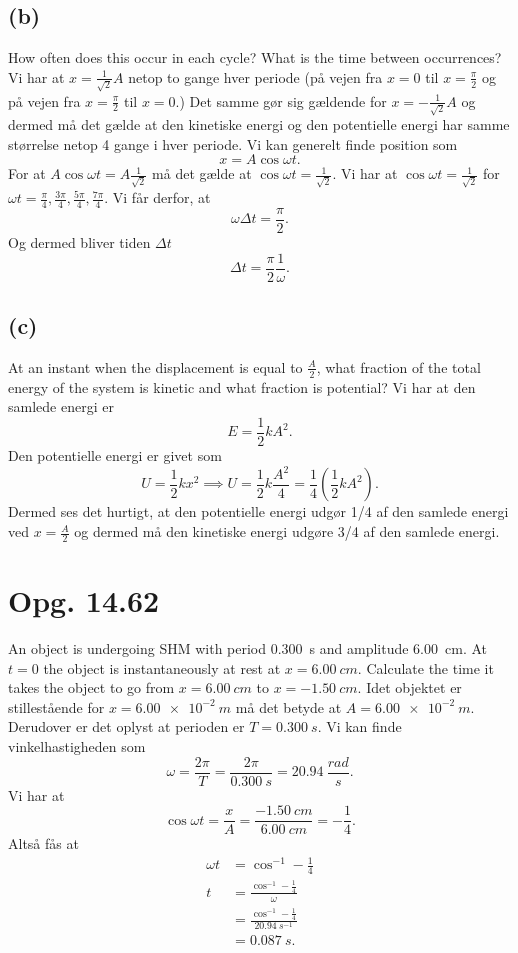 \documentclass[12pt]{article}
\theoremstyle{definition}
\begin{document}
\subsection*{(b)}
How often does this occur in each cycle? What is the time between occurrences?
\bigbreak
Vi har at $x = \frac{1}{\sqrt{2}}A$ netop to gange hver periode (på vejen fra $x = 0$ til $x = \frac{\pi}{2}$ og på vejen fra $x = \frac{\pi}{2}$ til $x = 0$.) Det samme gør sig gældende for $x = -\frac{1}{\sqrt{2}}A$ og dermed må det gælde at den kinetiske energi og den potentielle energi har samme størrelse netop 4 gange i hver periode. Vi kan generelt finde position som
\[ 
  x = A \cos \omega t
.\]
For at $A \cos \omega t = A \frac{1}{\sqrt{2}}$ må det gælde at $\cos \omega t = \frac{1}{\sqrt{2}}$. Vi har at $\cos \omega t = \frac{1}{\sqrt{2}}$ for $\omega t = \frac{\pi}{4}, \frac{3\pi}{4}, \frac{5\pi}{4}, \frac{7\pi}{4}$.
Vi får derfor, at 
\[ 
\omega \Delta t = \frac{\pi}{2}
.\]
Og dermed bliver tiden $\Delta t$
\[ 
  \Delta t = \frac{\pi}{2} \frac{1}{\omega}
.\]


\subsection*{(c)}
At an instant when the displacement is equal to $\frac{A}{2}$, what fraction of the total energy of the system is kinetic and what fraction is potential?
\bigbreak
Vi har at den samlede energi er
\[ 
E = \frac{1}{2}kA^2
.\]
Den potentielle energi er givet som
\[ 
U = \frac{1}{2}kx^2 \implies U = \frac{1}{2}k \frac{A^2}{4} = \frac{1}{4} \left( \frac{1}{2}kA^2 \right)
.\]
Dermed ses det hurtigt, at den potentielle energi udgør 1/4 af den samlede energi ved $x = \frac{A}{2}$ og dermed må den kinetiske energi udgøre 3/4 af den samlede energi.


\section*{Opg. 14.62}
An object is undergoing SHM with period \qty{0,300}{s} and amplitude \qty{6,00}{cm}. At $t = 0$ the object is instantaneously at rest at $x = \qty{6,00}{cm}$. Calculate the time it takes the object to go from $x = \qty{6,00}{cm}$ to $x = -\qty{1,50}{cm} $.
\bigbreak
Idet objektet er stillestående for $x = \qty{6,00e-2}{m}$ må det betyde at $A = \qty{6,00e-2}{m}$. Derudover er det oplyst at perioden er $T = \qty{0,300}{s}$. Vi kan finde vinkelhastigheden som
\[ 
\omega = \frac{2\pi}{T} = \frac{2\pi}{\qty{0,300}{s}} = \qty{20,94}{\frac{rad}{s}} 
.\]
Vi har at
\[ 
  \cos \omega t = \frac{x}{A} = \frac{\qty{-1,50}{cm}}{\qty{6,00}{cm}} = -\frac{1}{4}
.\]
Altså fås at
\begin{align*}
  \omega t &= \cos^{-1} -\frac{1}{4} \\
  t &= \frac{\cos^{-1} -\frac{1}{4}}{\omega} \\
  &= \frac{\cos^{-1} -\frac{1}{4}}{\qty{20,94}{s^{-1}}} \\
  &= \qty{0,087}{s}
.\end{align*}
\end{document}
